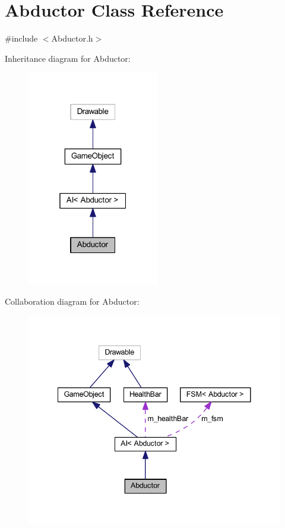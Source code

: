 \hypertarget{class_abductor}{}\section{Abductor Class Reference}
\label{class_abductor}


{\ttfamily \#include $<$Abductor.\+h$>$}



Inheritance diagram for Abductor\+:
\nopagebreak
\begin{figure}[H]
\begin{center}
\leavevmode
\includegraphics[width=163pt]{class_abductor__inherit__graph}
\end{center}
\end{figure}


Collaboration diagram for Abductor\+:
\nopagebreak
\begin{figure}[H]
\begin{center}
\leavevmode
\includegraphics[width=341pt]{class_abductor__coll__graph}
\end{center}
\end{figure}
